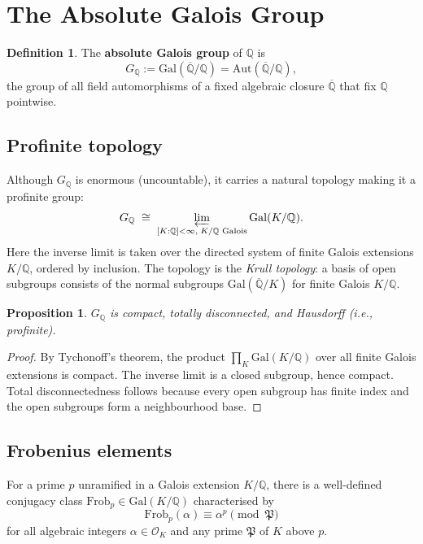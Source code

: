 \documentclass[a4paper,12pt]{amsart}
\newtheorem{proposition}[theorem]{Proposition}
\theoremstyle{definition}
\newtheorem{definition}[theorem]{Definition}
\theoremstyle{remark}
\newcommand{\Q}{\mathbb{Q}}
\newcommand{\Qbar}{\overline{\mathbb{Q}}}
\newcommand{\GQ}{\mathrm{Gal}(\overline{\mathbb{Q}}/\mathbb{Q})}
\newcommand{\Frob}{\mathrm{Frob}}
\begin{document}
\section{The Absolute Galois Group}
\label{sec:galois-group}

\begin{definition}
The \textbf{absolute Galois group} of $\Q$ is
\[
  G_\Q := \GQ = \mathrm{Aut}(\Qbar/\Q),
\]
the group of all field automorphisms of a fixed algebraic closure $\Qbar$ that fix
$\Q$ pointwise.
\end{definition}

\subsection{Profinite topology}

Although $G_\Q$ is enormous (uncountable), it carries a natural topology making it
a profinite group:
\[
  G_\Q \;\cong\; \varprojlim_{[K:\Q] < \infty,\; K/\Q \text{ Galois}} \mathrm{Gal}(K/\Q).
\]
Here the inverse limit is taken over the directed system of finite Galois extensions
$K/\Q$, ordered by inclusion. The topology is the \emph{Krull topology}: a basis of
open subgroups consists of the normal subgroups $\mathrm{Gal}(\Qbar/K)$ for finite
Galois $K/\Q$.

\begin{proposition}
$G_\Q$ is compact, totally disconnected, and Hausdorff (i.e., profinite).
\end{proposition}

\begin{proof}
By Tychonoff's theorem, the product $\prod_K \mathrm{Gal}(K/\Q)$ over all finite
Galois extensions is compact. The inverse limit is a closed subgroup, hence compact.
Total disconnectedness follows because every open subgroup has finite index and the
open subgroups form a neighbourhood base.
\end{proof}

\subsection{Frobenius elements}

For a prime $p$ unramified in a Galois extension $K/\Q$, there is a well-defined
conjugacy class $\Frob_p \in \mathrm{Gal}(K/\Q)$ characterised by
\[
  \Frob_p(\alpha) \equiv \alpha^p \pmod{\mathfrak{P}}
\]
for all algebraic integers $\alpha \in \mathcal{O}_K$ and any prime $\mathfrak{P}$
of $K$ above $p$.
\end{document}
